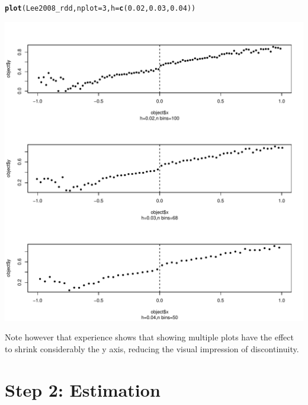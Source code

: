 \documentclass[english,nojss]{jss}\usepackage{graphicx, color}
\makeatletter
\def\maxwidth{ %
  \ifdim\Gin@nat@width>\linewidth
    \linewidth
  \else
    \Gin@nat@width
  \fi
}
\newcommand{\hlfunctioncall}[1]{\textcolor[rgb]{0.501960784313725,0,0.329411764705882}{\textbf{#1}}}%
\newenvironment{kframe}{%
 \def\at@end@of@kframe{}%
 \ifinner\ifhmode%
  \def\at@end@of@kframe{\end{minipage}}%
  \begin{minipage}{\columnwidth}%
 \fi\fi%
 \def\FrameCommand##1{\hskip\@totalleftmargin \hskip-\fboxsep
 \colorbox{shadecolor}{##1}\hskip-\fboxsep
     \hskip-\linewidth \hskip-\@totalleftmargin \hskip\columnwidth}%
 \MakeFramed {\advance\hsize-\width
   \@totalleftmargin\z@ \linewidth\hsize
   \@setminipage}}%
 {\par\unskip\endMakeFramed%
 \at@end@of@kframe}
\newenvironment{knitrout}{}{} %
\makeatother
\begin{document}
\begin{knitrout}
\color{fgcolor}\begin{kframe}
\begin{alltt}
\hlfunctioncall{plot}(Lee2008_rdd, nplot = 3, h = \hlfunctioncall{c}(0.02, 0.03, 0.04))
\end{alltt}


{\ttfamily\noindent\color{warningcolor}{\#\# Warning: font width unknown for character 0x9}}

{\ttfamily\noindent\color{warningcolor}{\#\# Warning: font width unknown for character 0x9}}

{\ttfamily\noindent\color{warningcolor}{\#\# Warning: font width unknown for character 0x9}}\end{kframe}
\includegraphics[width=\maxwidth]{figure/unnamed-chunk-5} 

\end{knitrout}


Note however that experience shows that showing multiple plots have
the effect to shrink considerably the y axis, reducing the visual
impression of discontinuity. 


\section{Step 2: Estimation}
\end{document}
